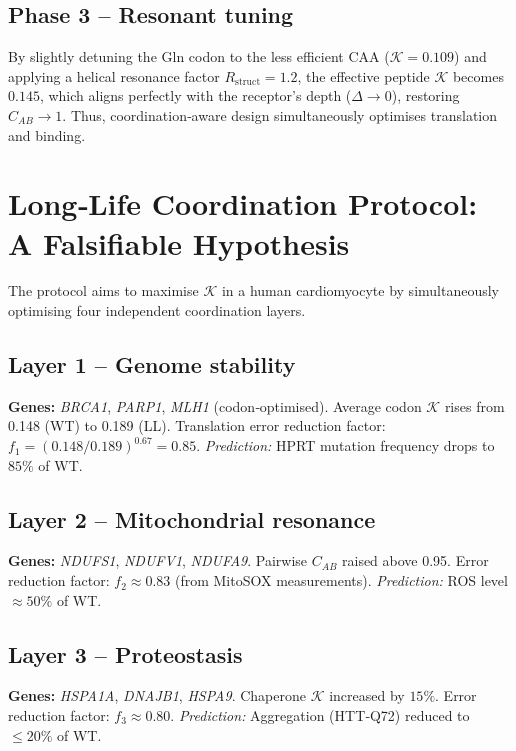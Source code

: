 \documentclass[12pt,a4paper]{article}
\newcommand{\REL}{\mathcal{K}}          %
\begin{document}
	\subsection{Phase 3 – Resonant tuning}
	By slightly detuning the Gln codon to the less efficient CAA (\(\REL=0.109\)) and applying a helical resonance factor \(R_{\mathrm{struct}}=1.2\), the effective peptide \(\REL\) becomes \(0.145\), which aligns perfectly with the receptor’s depth (\(\Delta \to 0\)), restoring \(C_{AB} \to 1\). Thus, coordination‑aware design simultaneously optimises translation and binding.
	
	\section{Long‑Life Coordination Protocol: A Falsifiable Hypothesis}
	\label{sec:LL}
	The protocol aims to maximise \(\REL\) in a human cardiomyocyte by simultaneously optimising four independent coordination layers.
	
	\subsection{Layer 1 – Genome stability}
	\textbf{Genes:} \emph{BRCA1}, \emph{PARP1}, \emph{MLH1} (codon‑optimised).  
	Average codon \(\REL\) rises from 0.148 (WT) to 0.189 (LL).  
	Translation error reduction factor: \(f_1 = (0.148/0.189)^{0.67} = 0.85\).  
	\textit{Prediction:} HPRT mutation frequency drops to \(85\%\) of WT.
	
	\subsection{Layer 2 – Mitochondrial resonance}
	\textbf{Genes:} \emph{NDUFS1}, \emph{NDUFV1}, \emph{NDUFA9}. Pairwise \(C_{AB}\) raised above 0.95.  
	Error reduction factor: \(f_2 \approx 0.83\) (from MitoSOX measurements).  
	\textit{Prediction:} ROS level \(\approx 50\%\) of WT.
	
	\subsection{Layer 3 – Proteostasis}
	\textbf{Genes:} \emph{HSPA1A}, \emph{DNAJB1}, \emph{HSPA9}. Chaperone \(\REL\) increased by \(15\%\).  
	Error reduction factor: \(f_3 \approx 0.80\).  
	\textit{Prediction:} Aggregation (HTT‑Q72) reduced to \(\le 20\%\) of WT.
	
\end{document}

